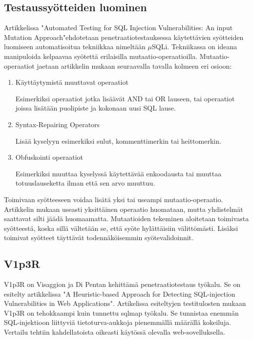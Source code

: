 \documentclass[finnish]{tktltiki2}
\theoremstyle{definition}
\theoremstyle{remark}
\begin{document}
	\subsection{Testaussyötteiden luominen}
	Artikkelissa "Automated Testing for SQL Injection Vulnerabilities: An input Mutation Approach"\cite{generation}\space ehdotetaan penetraatiotestauksessa käytettävien syötteiden luomiseen automatisoitua tekniikkaa nimeltään $\mu$SQLi. Tekniikassa on ideana manipuloida kelpaavaa syötettä erilaisilla mutaatio-operaatioilla. Mutaatio-operaatiot jaetaan artikkelin mukaan seuraavalla tavalla kolmeen eri osioon:
	\begin{enumerate}
	\item Käyttäytymistä muuttavat operaatiot
	
	Esimerkiksi operaatiot jotka lisäävät AND tai OR lauseen, tai operaatiot joissa lisätään puolipiste ja kokonaan uusi SQL lause. 
	
	\item Syntax-Repairing Operators
	
	Lisää kyselyyn esimerkiksi sulut, kommenttimerkin tai heittomerkin.
	
	\item Obfuskointi operaatiot
	
	Esimerkiksi muuttaa kyselyssä käytettävää enkoodausta tai muuttaa totuuslauseketta ilman että sen arvo muuttuu.
	\end{enumerate}
	
	Toimivaan syötteeseen voidaa lisätä yksi tai useampi mutaatio-operaatio. Artikkelin mukaan useasti yksittäinen operaatio huomataan, mutta yhdistelmät saattavat silti jäädä huomaamatta. Mutaatioiden tekeminen aloitetaan toimivasta syötteestä, koska sillä vältetään se, että syöte hylättäisiin välittömästi. Lisäksi toimivat syötteet täyttävät todennäköisemmin syötevalidoinnit. 
	
	\subsection{V1p3R}
	V1p3R on Visaggion ja Di Pentan kehittämä penetraatiotestaus työkalu. Se on esitelty artikkelissa "A Heuristic-based Approach for Detecting SQL-injection Vulnerabilities in Web Applications"\space\cite{viper}. Artikelissa esiteltyjen testitulosten mukaan V1p3R on tehokkaampi kuin tunnettu sqlmap työkalu. Se tunnistaa enemmän SQL-injektioon liittyviä tietoturva-aukkoja pienemmällä määrällä kokeiluja. Vertailu tehtiin kahdellatoista oikeasti käytössä olevalla web-sovelluksella.
	
\end{document}
